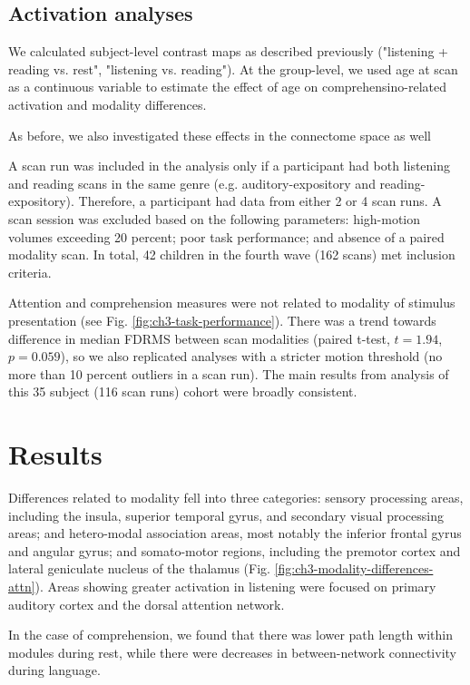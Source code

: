 \subsection{Activation analyses}

We calculated subject-level contrast maps as described previously ("listening + reading vs. rest", "listening vs. reading"). At the group-level, we used age at scan as a continuous variable to estimate the effect of age on comprehensino-related activation and modality differences.

As before, we also investigated these effects in the connectome space as well 



A scan run was included in the analysis only if a participant had both listening and reading scans in the same genre (e.g. auditory-expository and reading-expository). Therefore, a participant had data from either 2 or 4 scan runs. A scan session was excluded based on the following parameters: high-motion volumes exceeding 20 percent; poor task performance; and absence of a paired modality scan. In total, 42 children in the fourth wave (162 scans) met inclusion criteria. 

Attention and comprehension measures were not related to modality of stimulus presentation (see Fig. \ref{fig:ch3-task-performance}). There was a trend towards difference in median FDRMS between scan modalities (paired t-test, $t = 1.94$, $p = 0.059$), so we also replicated analyses with a stricter motion threshold (no more than 10 percent outliers in a scan run). The main results from analysis of this 35 subject (116 scan runs) cohort were broadly consistent.


\section{Results}



Differences related to modality fell into three categories: sensory processing areas, including the insula, superior temporal gyrus, and secondary visual processing areas; and hetero-modal association areas, most notably the inferior frontal gyrus and angular gyrus; and somato-motor regions, including the premotor cortex and lateral geniculate nucleus of the thalamus (Fig. \ref{fig:ch3-modality-differences-attn}). Areas showing greater activation in listening were focused on primary auditory cortex and the dorsal attention network.


In the case of comprehension, we found that there was lower path length within modules during rest, while there were decreases in between-network connectivity during language.

